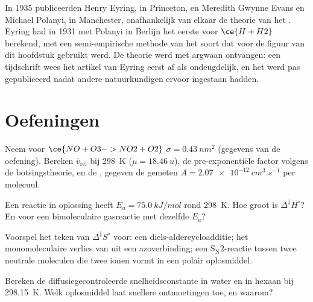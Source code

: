 \begin{history}
In 1935 publiceerden Henry Eyring, in Princeton, en Meredith Gwynne Evans
en Michael Polanyi, in Manchester, onafhankelijk van elkaar de theorie van
het . Eyring had in 1931 met Polanyi in Berlijn het
eerste  voor $\ce{H + H2}$ berekend, met een
semi-empirische methode van het soort dat voor de figuur van dit hoofdstuk
gebruikt werd. De theorie werd met argwaan ontvangen: een tijdschrift
wees het artikel van Eyring eerst af als ondeugdelijk, en het werd pas
gepubliceerd nadat andere natuurkundigen ervoor ingestaan hadden.
\end{history}

\section{Oefeningen}

\begin{exercise}[$\star$]\label{exo:b3:rate-theories:1}
Neem voor $\ce{NO + O3 -> NO2 + O2}$ $\sigma = \qty{0.43}{nm^2}$ (gegevens van de oefening). Bereken $\bar v_{\mathrm{rel}}$
bij \qty{298}{K} ($\mu = \qty{18.46}{u}$), de pre-exponentiële factor
volgens de botsingstheorie, en de , gegeven de gemeten $A = \qty{2.07e-12}{cm^3.s^{-1}}$ per molecuul.
\end{exercise}

\begin{exercise}[$\star$]\label{exo:b3:rate-theories:2}
Een reactie in oplossing heeft $E_a = \qty{75.0}{kJ/mol}$ rond \qty{298}{K}.
Hoe groot is $\Delta^{\ddagger}H^\circ$? En voor een bimoleculaire
gasreactie met dezelfde $E_a$?
\end{exercise}

\begin{exercise}[$\star$]\label{exo:b3:rate-theories:3}
Voorspel het teken van $\Delta^{\ddagger}S^\circ$ voor: een
diels-aldercycloadditie; het monomoleculaire verlies van  uit een
azoverbinding; een $\mathrm{S_N2}$-reactie tussen twee neutrale moleculen
die twee ionen vormt in een polair oplosmiddel.
\end{exercise}

\begin{exercise}[$\star$]\label{exo:b3:rate-theories:4}
Bereken de diffusiegecontroleerde snelheidsconstante in water en in hexaan
bij \qty{298.15}{K}. Welk oplosmiddel laat snellere ontmoetingen toe, en
waarom?
\end{exercise}

